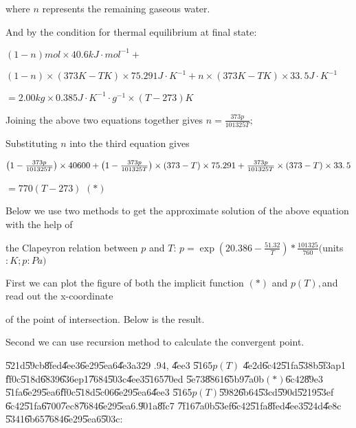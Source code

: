 \documentclass{article}
\begin{document}
where $n$ represents the remaining gaseous water.

And by the condition for thermal equilibrium at final state:

$\left( 1-n\right) \unit{mol}\times 40.6\unit{kJ}\cdot \unit{mol}^{-1}+$

$\left( 1-n\right) \times \left( 373\unit{K}-T\unit{K}\right) \times 75.291%
\unit{J}\cdot \unit{K}^{-1}+n\times \left( 373\unit{K}-T\unit{K}\right)
\times \allowbreak 33.\,\allowbreak 5\unit{J}\cdot \unit{K}^{-1}$

$=2.00\unit{kg}\times 0.385\unit{J}\cdot \unit{K}^{-1}\cdot \unit{g}%
^{-1}\times \left( T-273\right) \unit{K}$

Joining the above two equations together gives $n=\frac{373p}{101325T};$

Substituting $n$ into the third equation gives

$\left( 1-\frac{373p}{101325T}\right) \times 40600+\left( 1-\frac{373p}{%
101325T}\right) \times \left( 373-T\right) \times 75.291+\frac{373p}{101325T}%
\times \left( 373-T\right) \times \allowbreak 33.\,\allowbreak 5$

$=770\left( T-273\right) $ $\left( \ast \right) $

Below we use two methods to get the approximate solution of the above
equation with the help of

the Clapeyron relation between $p$ and $T$: $p=\exp \left( 20.386-\frac{51.32%
}{T}\right) \ast \frac{101325}{760}($units$:\unit{K};p:\unit{Pa})$

First we can plot the figure of both the implicit function $\left( \ast
\right) $ and $p\left( T\right) ,$and read out the x-coordinate \ \qquad\ \ 

of the point of intersection. Below is the result.


Second we can use recursion method to calculate the convergent point.

\U{521d}\U{59cb}\U{8fed}\U{4ee3}\U{6e29}\U{5ea6}\U{4e3a}329 .94, \U{4ee3}%
\U{5165}$p\left( T\right) $ \U{4e2d}\U{6c42}\U{51fa}\U{538b}\U{5f3a}p1%
\U{ff0c}\U{518d}\U{6839}\U{636e}p1\U{7684}\U{503c}\U{4ee3}\U{5165}\U{70ed}%
\U{5e73}\U{8861}\U{65b9}\U{7a0b}$\left( \ast \right) $\U{6c42}\U{89e3}%
\U{51fa}\U{6e29}\U{5ea6}\U{ff0c}\U{518d}\U{5c06}\U{6e29}\U{5ea6}\U{4ee3}%
\U{5165}$p\left( T\right) $\U{5982}\U{6b64}\U{53cd}\U{590d}\U{5219}\U{53ef}%
\U{6c42}\U{51fa}\U{6700}\U{7ec8}\U{7684}\U{6e29}\U{5ea6}.\U{901a}\U{8fc7}%
\U{7f16}\U{7a0b}\U{53ef}\U{6c42}\U{51fa}\U{8fed}\U{4ee3}\U{524d}\U{4e8c}%
\U{5341}\U{6b65}\U{7684}\U{6e29}\U{5ea6}\U{503c}:
\end{document}
